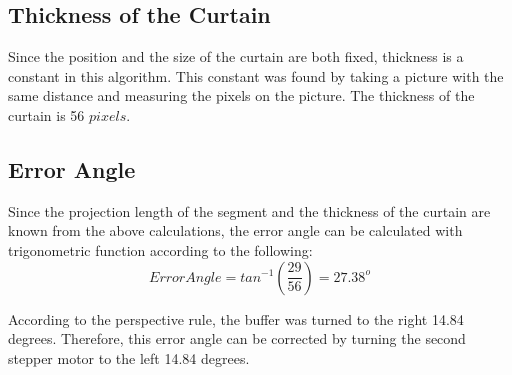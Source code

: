 \subsection{Thickness of the Curtain}

Since the position and the size of the curtain are both fixed, thickness is a constant in this algorithm. This constant was found by taking a picture with the same distance and measuring the pixels on the picture. The thickness of the curtain is 56 $pixels$.

\subsection{Error Angle}

Since the projection length of the segment and the thickness of the curtain are known from the above calculations, the error angle can be calculated with trigonometric function according to the following:
\begin{equation}
Error Angle = tan^{-1}(\frac{29}{56}) = 27.38^o
\end{equation}

According to the perspective rule, the buffer was turned to the right 14.84 degrees. Therefore, this error angle can be corrected by turning the second stepper motor to the left 14.84 degrees. 